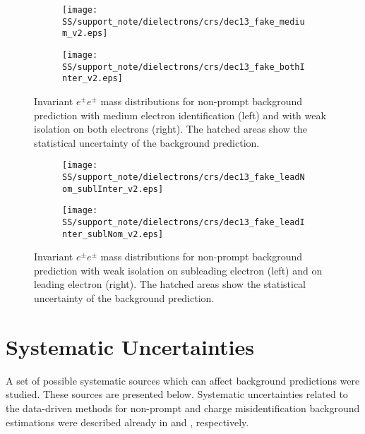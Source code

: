 \begin{figure}
\begin{subfigure}{.5\textwidth}
  \centering
  \texttt{[image: SS/support\_note/dielectrons/crs/dec13\_fake\_medium\_v2.eps]}
\end{subfigure}%
\begin{subfigure}{.5\textwidth}
  \centering
  \texttt{[image: SS/support\_note/dielectrons/crs/dec13\_fake\_bothInter\_v2.eps]}
\end{subfigure}
\caption{Invariant $e^{\pm}e^{\pm}$ mass distributions for non-prompt background prediction with medium electron identification (left) and with weak isolation on both electrons (right).
The hatched areas show the statistical uncertainty of the background prediction.}
  \label{fig:fakeCR_part1}
\end{figure}

\begin{figure}
\begin{subfigure}{.5\textwidth}
  \centering
  \texttt{[image: SS/support\_note/dielectrons/crs/dec13\_fake\_leadNom\_sublInter\_v2.eps]}
\end{subfigure}%
\begin{subfigure}{.5\textwidth}
  \centering
  \texttt{[image: SS/support\_note/dielectrons/crs/dec13\_fake\_leadInter\_sublNom\_v2.eps]}
\end{subfigure}
\caption{Invariant $e^{\pm}e^{\pm}$ mass distributions for non-prompt background prediction with weak isolation on subleading electron (left) and on leading electron (right).
The hatched areas show the statistical uncertainty of the background prediction.}
  \label{fig:fakeCR_part2}
\end{figure}



\section{Systematic Uncertainties}
\label{sec:ss_Systematics}

A set of possible systematic sources which can affect background predictions were studied.
These sources are presented below.
Systematic uncertainties related to the data-driven methods for non-prompt and charge misidentification background estimations
were described already in  and , respectively.

